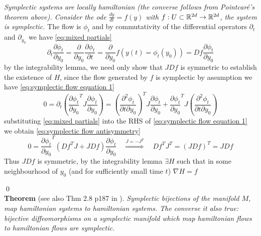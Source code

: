 \documentclass[12pt]{article}
\begin{document}
 \textit{Symplectic systems are locally hamiltonian (the converse follows from Pointcar\'e's theorem above). Consider the ode $\frac{dy}{dt} = f(y)$ with $f : U\subset \mathbb{R}^{2d}\to \mathbb{R}^{2d}$, the system is symplectic.} The flow is $\phi_t$ and by commutativity of the differential operators $\partial_t$ and $\partial_{y_0}$ we have \eqref{eq:mixed partials}
\begin{equation}\label{eq:mixed partials}
\partial_t \frac{\partial \phi_t}{\partial y_0} = \frac{\partial }{\partial y_0}\frac{\partial \phi_t}{\partial t} = \frac{\partial }{\partial y_0}f\left(y(t)=\phi_t(y_0)\right) = Df \frac{\partial \phi_t}{\partial y_0}
\end{equation}
by the integrability lemma, we need only show that $JDf$ is symmetric to establish the existence of $H$, since the flow generated by $f$ is symplectic by assumption we have \eqref{eq:symplectic flow equation 1} 
\begin{equation}\label{eq:symplectic flow equation 1}
    0 = \partial_t \left( \frac{\partial \phi_t}{\partial y_0}^T J \frac{\partial \phi_t}{\partial y_0} \right) = 
    \left( \frac{\partial^2 \phi_t}{\partial t\partial y_0} \right)^T J \frac{\partial \phi_t}{\partial y_0} + \frac{\partial \phi_t}{\partial y_0}^T J \left( \frac{\partial^2 \phi_t}{\partial t\partial y_0} \right)
\end{equation}
substituting \eqref{eq:mixed partials} into the RHS of \eqref{eq:symplectic flow equation 1} we obtain \eqref{eq:symplectic flow antisymmetry}
\begin{equation}\label{eq:symplectic flow antisymmetry}
    0 = \frac{\partial \phi_t}{\partial y_0}^T \left(
    Df^T J + JDf
    \right)\frac{\partial \phi_t}{\partial y_0}\quad \stackrel{J = -J^T}{\Longrightarrow}\quad Df^T J^T = (JDf)^T = JDf
\end{equation}
Thus $JDf$ is symmetric, by the integrability lemma $\exists H$ such that in some neighbourhood of $y_0$ (and for sufficiently small time $t$) $\nabla H = f$

\qed\\

\textbf{Theorem} (see also Thm 2.8 p187 in \cite{Numerical}). \textit{Symplectic bijections of the manifold $M$, map hamiltonian systems to hamiltonian systems. The converse it also true: bijective diffeomorphisms on a symplectic manifold which map hamiltonian flows to hamiltonian flows are symplectic.}\\
\end{document}
